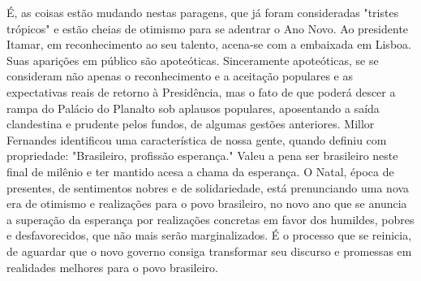 É, as coisas estão mudando nestas paragens, que já foram consideradas "tristes trópicos" e estão cheias de otimismo para se adentrar o Ano Novo.
Ao presidente Itamar, em reconhecimento ao seu talento, acena-se com a embaixada em Lisboa. Suas aparições em público são apoteóticas. Sinceramente apoteóticas, se se consideram não apenas o reconhecimento e a aceitação populares e as expectativas reais de retorno à Presidência, mas o fato de que poderá descer a rampa do Palácio do Planalto sob aplausos populares, aposentando a saída clandestina e prudente pelos fundos, de algumas gestões anteriores.
Millor Fernandes identificou uma característica de nossa gente, quando definiu com propriedade: "Brasileiro, profissão esperança." Valeu a pena ser brasileiro neste final de milênio e ter mantido acesa a chama da esperança.
O Natal, época de presentes, de sentimentos nobres e de solidariedade, está prenunciando uma nova era de otimismo e realizações para o povo brasileiro, no novo ano que se anuncia a superação da esperança por realizações concretas em favor dos humildes, pobres e desfavorecidos, que não mais serão marginalizados.
É o processo que se reinicia, de aguardar que o novo governo consiga transformar seu discurso e promessas em realidades melhores para o povo brasileiro.

